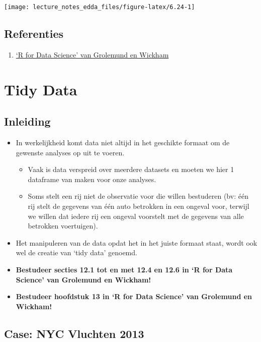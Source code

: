 \documentclass[]{memoir}
\providecommand{\tightlist}{%
  \setlength{\itemsep}{0pt}\setlength{\parskip}{0pt}}
\begin{document}
\texttt{[image: lecture\_notes\_edda\_files/figure-latex/6.24-1]}

\section{Referenties}\label{referenties-4}

\begin{enumerate}
\def\labelenumi{\arabic{enumi}.}
\tightlist
\item
  \href{http://r4ds.had.co.nz/}{`R for Data Science' van Grolemund en
  Wickham}
\end{enumerate}

\chapter{Tidy Data}\label{tidy-data}

\section{Inleiding}\label{inleiding-1}

\begin{itemize}
\tightlist
\item
  In werkelijkheid komt data niet altijd in het geschikte formaat om de
  gewenste analyses op uit te voeren.

  \begin{itemize}
  \tightlist
  \item
    Vaak is data verspreid over meerdere datasets en moeten we hier 1
    dataframe van maken voor onze analyses.
  \item
    Soms stelt een rij niet de observatie voor die willen bestuderen
    (bv: één rij stelt de gegevens van één auto betrokken in een ongeval
    voor, terwijl we willen dat iedere rij een ongeval voorstelt met de
    gegevens van alle betrokken voertuigen).
  \end{itemize}
\item
  Het manipuleren van de data opdat het in het juiste formaat staat,
  wordt ook wel de creatie van `tidy data' genoemd.
\item
  \textbf{Bestudeer secties 12.1 tot en met 12.4 en 12.6 in `R for Data
  Science' van Grolemund en Wickham!}
\item
  \textbf{Bestudeer hoofdstuk 13 in `R for Data Science' van Grolemund
  en Wickham!}
\end{itemize}

\section{Case: NYC Vluchten 2013}\label{case-nyc-vluchten-2013-3}
\end{document}
